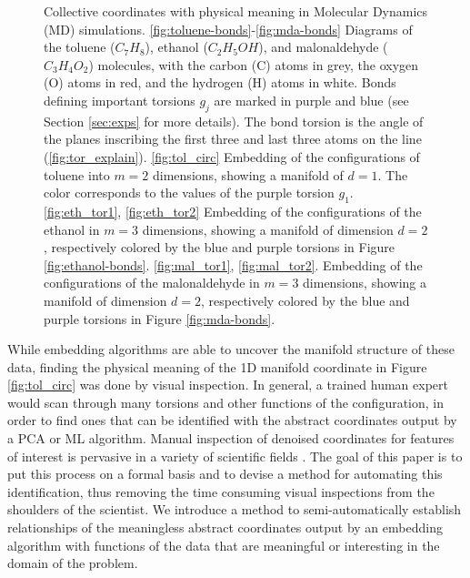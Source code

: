 \begin{figure}[htb]
\caption{Collective coordinates with physical meaning in Molecular Dynamics (MD) simulations. \ref{fig:toluene-bonds}-\ref{fig:mda-bonds} Diagrams of the toluene ($C_7 H_8$), ethanol ($C_2H_5OH$), and malonaldehyde ($C_3H_4O_2$) molecules, with the carbon (C) atoms in grey, the oxygen (O) atoms in red, and the hydrogen (H) atoms in white. Bonds defining important torsions $g_j$ are marked in purple and blue  (see Section \ref{sec:exps} for more details). The bond torsion is the angle of the planes inscribing the first three and last three atoms on the line (\ref{fig:tor_explain}).  \ref{fig:tol_circ} Embedding of the configurations of toluene into $m=2$ dimensions, showing a manifold of $d=1$. The color corresponds to the values of the purple torsion $g_1$. \ref{fig:eth_tor1}, \ref{fig:eth_tor2} Embedding of the configurations of the ethanol in $m=3$ dimensions, showing a manifold of dimension $d=2$, respectively colored by the blue and purple torsions in Figure \ref{fig:ethanol-bonds}. \ref{fig:mal_tor1}, \ref{fig:mal_tor2}. Embedding of the configurations of the malonaldehyde in $m=3$ dimensions, showing a manifold of dimension $d=2$, respectively colored by the blue and purple torsions in Figure \ref{fig:mda-bonds}.}
    \label{fig:molecs}
\end{figure}
%

While embedding algorithms are able to uncover the manifold structure of these data, finding the physical meaning of the 1D manifold coordinate in Figure \ref{fig:tol_circ} was done by visual inspection. In general, a trained human expert would scan through many torsions and other functions of the configuration, in order to find ones that can be identified with the abstract coordinates output by a PCA or ML algorithm. Manual inspection of denoised coordinates for features of interest is pervasive in a variety of scientific fields \citep{Chen2016-eq, Herring2018-cq}. The goal of this paper is to put this process on a formal basis and to devise a method for automating this identification, thus removing the time consuming visual inspections from the shoulders of the scientist. We introduce a method to semi-automatically establish relationships of the meaningless abstract coordinates output by an embedding algorithm with functions of the data that are meaningful or interesting in the domain of the problem.

